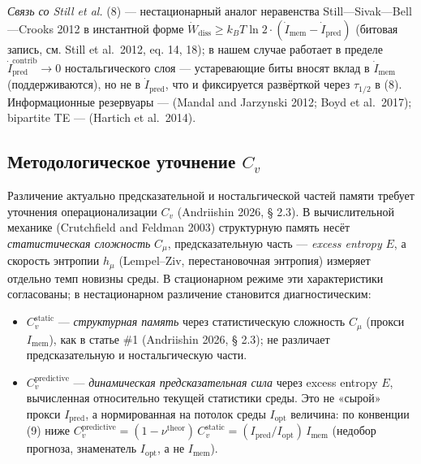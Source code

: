 \documentclass[pdflatex,sn-mathphys-ay]{sn-jnl}
\providecommand{\tightlist}{\setlength{\itemsep}{0pt}\setlength{\parskip}{0pt}}
\begin{document}
\emph{Связь со Still et al.} (8) --- нестационарный аналог неравенства Still---Sivak---Bell---Crooks 2012 в инстантной форме \(\dot W_{\text{diss}} \ge k_B T \ln 2 \cdot (\dot I_{\text{mem}} - \dot I_{\text{pred}})\) (битовая запись, см. Still et al.~2012, eq. 14, 18); в нашем случае работает в пределе \(\dot I_{\text{pred}}^{\text{contrib}} \to 0\) ностальгического слоя --- устаревающие биты вносят вклад в \(\dot I_{\text{mem}}\) (поддерживаются), но не в \(\dot I_{\text{pred}}\), что и фиксируется развёрткой через \(\tau_{1/2}\) в (8). Информационные резервуары --- (Mandal and Jarzynski 2012; Boyd et al.~2017); bipartite TE --- (Hartich et al.~2014).



\subsection{\texorpdfstring{Методологическое уточнение \(C_v\)}{Методологическое уточнение C\_v}}\label{ux43cux435ux442ux43eux434ux43eux43bux43eux433ux438ux447ux435ux441ux43aux43eux435-ux443ux442ux43eux447ux43dux435ux43dux438ux435-c_v}



Различение актуально предсказательной и ностальгической частей памяти требует уточнения операционализации \(C_v\) (Andriishin 2026, § 2.3). В вычислительной механике (Crutchfield and Feldman 2003) структурную память несёт \emph{статистическая сложность} \(C_\mu\), предсказательную часть --- \emph{excess entropy} \(E\), а скорость энтропии \(h_\mu\) (Lempel--Ziv, перестановочная энтропия) измеряет отдельно темп новизны среды. В стационарном режиме эти характеристики согласованы; в нестационарном различение становится диагностическим:



\begin{itemize}

\tightlist

\item

  \(C_v^{\text{static}}\) --- \emph{структурная память} через статистическую сложность \(C_\mu\) (прокси \(I_{\text{mem}}\)), как в статье \#1 (Andriishin 2026, § 2.3); не различает предсказательную и ностальгическую части.

\item

  \(C_v^{\text{predictive}}\) --- \emph{динамическая предсказательная сила} через excess entropy \(E\), вычисленная относительно текущей статистики среды. Это не «сырой» прокси \(I_{\text{pred}}\), а нормированная на потолок среды \(I_{\text{opt}}\) величина: по конвенции (9) ниже \(C_v^{\text{predictive}} = (1-\nu^{\text{theor}})\,C_v^{\text{static}} = (I_{\text{pred}}/I_{\text{opt}})\,I_{\text{mem}}\) (недобор прогноза, знаменатель \(I_{\text{opt}}\), а не \(I_{\text{mem}}\)).

\end{itemize}
\end{document}
